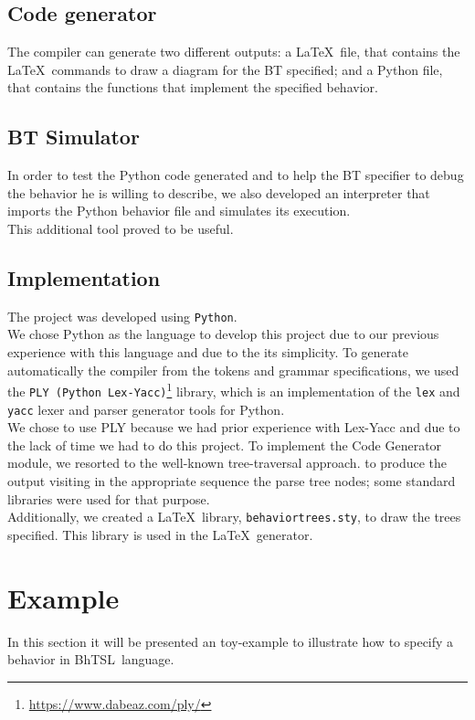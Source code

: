 \documentclass[a4paper,UKenglish,cleveref, autoref, thm-restate]{oasics-v2019}
\def\bht{BhTSL}
\begin{document}

\subsection{Code generator}
The compiler can generate two different outputs: 
a \LaTeX\ file, that contains the \LaTeX\ commands to draw a diagram for the BT specified; 
and a Python file, that contains the functions that implement the specified behavior.


\subsection{BT Simulator}
In order to test the Python code generated and to help the BT specifier to debug the behavior he is willing
to describe, we also developed an interpreter that imports the Python behavior file and simulates its
execution.\\
This additional tool proved to be useful.

\subsection{Implementation}


The project was developed using \texttt{Python}.\\
We chose Python as the language to develop this project due to our previous experience with this language and due to the its simplicity.
To generate automatically the compiler from the tokens and grammar specifications, 
we used the \texttt{PLY (Python Lex-Yacc)}\footnote{\url{https://www.dabeaz.com/ply/}} library, which is an implementation of the 
\texttt{lex} and \texttt{yacc} lexer and parser generator tools for Python.\\
We chose to use PLY because we had prior experience with Lex-Yacc and due to the lack of time we had to do this project.
To implement the Code Generator module, we resorted to the well-known tree-traversal approach.
to produce the output visiting in the appropriate sequence the parse tree nodes;
 some standard libraries were used for that purpose.\\
Additionally, we created a \LaTeX\ library, \texttt{behaviortrees.sty}, to draw the trees specified. 
This library is used in the \LaTeX\ generator.

\section{Example}
\label{sec:example}
In this section it will be presented an toy-example to illustrate how to specify a behavior in \bht\ language.
\end{document}
